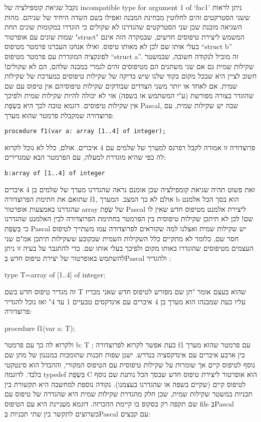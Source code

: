 \begin{טבלא}[!htbp]
      נקבל שגיאת קומפילציה של incompatible type for argument 1 of `fac1'
      ניתן לראות ששני הסטרקטים זהים לחלוטין מבחינת המבנה ואפילו בשם השדה היחיד של שניהם.
      מהות השגיאה מובנת שכן שני הסטרקטים שהגדרנו לא שקולים כי הוגדרו במקומות שונים תחת שמות שונים עם אופרטור "struct" המשמש ליצירת טיפוסים חדשים, שבמקרה הזה אינם בעלי אותו שם לכן לא מאותו טיפוס. ואילו אנחנו העברנו פרמטר מטיפוס “struct b” לפונקציה המוגדרת עם פרמטר מטיפוס “struct a”. זה מוביל לנקודה חשובה, שבמשטר שקילות שמית גם אם שני משתנים הם מטיפוסים זהים לגמרי במבנה שלהם, הם לא שקולים!
      חשוב לציין היא שבכל מקום בקוד שלנו שיש בדיקה של שקילות טיפוסים במערכת של שקילות שמית, אם לאחד או יותר משני הצדדים שבודקים שקילות טיפוסיהם אין טיפוס עם שם שהוגדר בצורה מפורשת (ע"י המשתמש או בשפה) אזי לא יכולה להיות שקילות שמית ולפיכך אין שקילות טיפוסים. דוגמא טובה לכך היא בִּשְׂפַת Pascal, שבה יש שקילות שמית, עם פרוצדורה שמקבלת פרמטר שהוא מערך:

\begin{verbatim}
procedure f1(var a: array [1..4] of integer);
\end{verbatim}

      פרוצדורה זו אמורה לקבל רפרנס למערך של שלמים עם 4 איברים. אולם, כלל לא נוכל לקרוא לה כפי שהיא מוגדרת למעלה, עם הפרמטר הבא שמגדירים:

\begin{verbatim}
b:array of [1..4] of integer
\end{verbatim}

      זאת פשוט תהיה שגיאת קומפילציה שכן אומנם נראה שהגדרנו מערך של שלמים בן 4 איברים שתואם את חתימת הפרוצדורה f1, אולם לא כך המצב. המערך b הוא בסך הכל אלמנט שהגדרנו באמצעות אופרטור array של שְׂפַת Pascal ליצירת אלמנט מטיפוס חדש שאין לו שם! לכן לא תיתכן שקילות טיפוסית בין הפרמטר בחתימת הפרוצדורה לבין האלמנט שהגדרנו כי בִּשְׂפַת Pascal יש שקילות שמית ואצלנו למה שקוראים לפרוצדורה עמו משתייך לטיפוס חסר שם, כלומר לא מתקיים כלל השקילות השמית שכקובע ששקילות תיתכן אמ"ם שני העצמים מטיפוסים שהוגדרו באותו מקום ולפיכך בעלי אותו שם.
      כדי להתגבר על בעיה זו ניתן להשתמש באופרטור של יצירת טיפוס חדש בְּPascal ולהגדיר :

      type T=array of [1..4] of integer;

      זה מגדיר טיפוס חדש בשם T שהוא בעצם אומר "תן שם מפורש לטיפוס חדש שאני מכריז עליו כעת שמבנהו הוא מערך בן 4 איברים עם אינדקסים טבעיים 1 עד 4" ואז נוכל להגדיר פרוצדורה:

      procedure f1(var a: T);

      ולקרוא לה כך עם פרמטר
      b: T ;
      כעת אפשר לקרוא לפרוצדורה f1 עם פרמטר שהוא מערך בין ארבע איברים עם אינדקסציה
      כנדרש. ישנן שפות תכנות שתומכות במנגנון של מתן שם נוסף לטיפוס קיים אך שומרות על
      שקילות טיפוסית עם הטיפוס המקורי, וההבדל הוא סינטקטי בלבד. לדוגמה typedef בִּשְׂפַת C
      הוא אופרטור ליצירת טיפוס חדש שבסך הכל נותנת שם נוסף לטיפוס קיים (שקיים בשפה או
      שהגדרנו בעצמנו). נקודה נוספת למחשבה היא תקשורת בין תכניות במשטר שקילות שמית,
      שכן חלק מהגדרת שקילות שמית היא שהגדרה של טיפוס עם שם תקפה רק בסקופ בו קיימת
      ההכרזה. דוגמא מעניינת היא עם הטיפוס file בְּPascal כשרוצים לתקשר בין שתי תכניות
      בְּPascal עם קבצים:


\end{טבלא}
